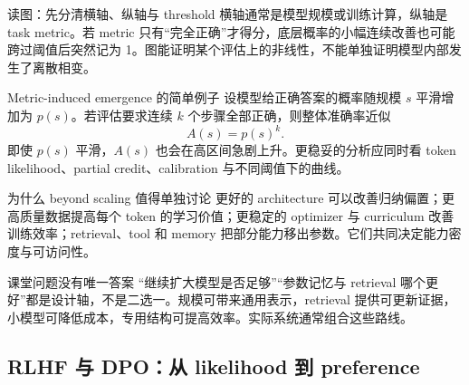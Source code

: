 \begin{knowledgebox}{读图：先分清横轴、纵轴与 threshold}
横轴通常是模型规模或训练计算，纵轴是 task metric。若 metric 只有“完全正确”才得分，底层概率的小幅连续改善也可能跨过阈值后突然记为 1。图能证明某个评估上的非线性，不能单独证明模型内部发生了离散相变。
\end{knowledgebox}


\begin{importantbox}{Metric-induced emergence 的简单例子}
设模型给正确答案的概率随规模 $s$ 平滑增加为 $p(s)$。若评估要求连续 $k$ 个步骤全部正确，则整体准确率近似
\[
A(s)=p(s)^k.
\]
即使 $p(s)$ 平滑，$A(s)$ 也会在高区间急剧上升。更稳妥的分析应同时看 token likelihood、partial credit、calibration 与不同阈值下的曲线。
\end{importantbox}




\begin{knowledgebox}{为什么 beyond scaling 值得单独讨论}
更好的 architecture 可以改善归纳偏置；更高质量数据提高每个 token 的学习价值；更稳定的 optimizer 与 curriculum 改善训练效率；retrieval、tool 和 memory 把部分能力移出参数。它们共同决定能力密度与可访问性。
\end{knowledgebox}


\begin{warningbox}{课堂问题没有唯一答案}
“继续扩大模型是否足够”“参数记忆与 retrieval 哪个更好”都是设计轴，不是二选一。规模可带来通用表示，retrieval 提供可更新证据，小模型可降低成本，专用结构可提高效率。实际系统通常组合这些路线。
\end{warningbox}

\subsection{RLHF 与 DPO：从 likelihood 到 preference}


